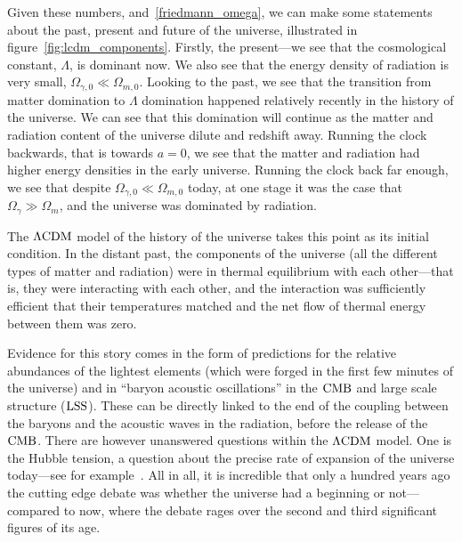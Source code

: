     Given these numbers, and~\eqref{friedmann_omega}, we can make some statements
    about the past, present and future of the universe, illustrated in figure~\ref{fig:lcdm_components}.
    Firstly, the present---we see that the cosmological constant,
    $\Lambda$, is dominant now. We also see that the energy density of radiation
    is very small, $\Omega_{\gamma,0}\ll\Omega_{m,0}$.
    Looking to the past, we see that the transition from matter domination
    to $\Lambda$ domination happened relatively recently in the history of the universe.
    We can see that this domination will continue as the matter and radiation content of the
    universe dilute and redshift away.
    Running the clock backwards, that is towards $a=0$, we see that the matter and radiation had
    higher energy densities in the early universe. Running the clock back far enough, we see
    that despite $\Omega_{\gamma,0}\ll\Omega_{m,0}$ today, at one stage it was the
    case that $\Omega_{\gamma}\gg\Omega_{m}$, and the universe was dominated by radiation.


    The $\Lambda\text{CDM}$ model of the history of the universe takes this point as its initial condition.
    In the distant past, the components of the universe (all the different types of matter and radiation)
    were in thermal equilibrium with each other---that is, they were interacting with each other,
    and the interaction was sufficiently efficient that their temperatures matched
    and the net flow of thermal energy between them was zero.


    Evidence for this story comes in the form of predictions for the relative abundances of the lightest
    elements (which were forged in the first few minutes of the universe)
    and in ``baryon acoustic oscillations'' in the $\text{CMB}$ and large scale structure ($\text{LSS}$).
    These can be directly linked to the end of the coupling
    between the baryons and the acoustic waves in the radiation,
    before the release of the $\text{CMB}$.
    There are however unanswered questions within the $\Lambda\text{CDM}$ model.
    One is the Hubble tension, a question about the
    precise rate of expansion of the universe today---see for example~\cite{tensions_2019, Freedman_2021}.
    All in all, it is incredible that only a hundred years ago the cutting edge debate was
    whether the universe had a beginning or not---compared to
    now, where the debate rages over the second and
    third significant figures of its age.


